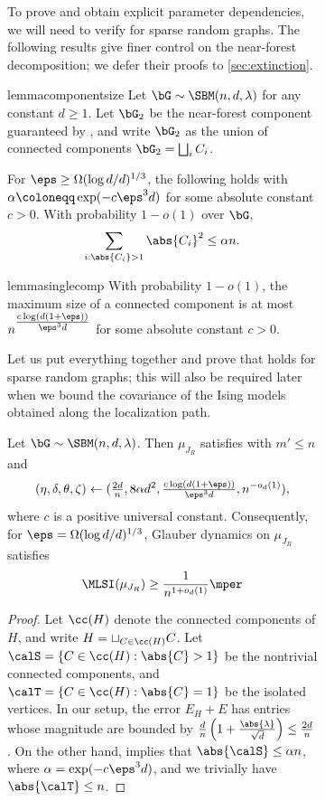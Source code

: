 \documentclass[11pt,letterpaper]{article}
\begin{document}
\begin{figure}
\begin{figure}
To prove  and obtain explicit parameter dependencies, we will need to verify  for sparse random graphs. 
The following results give finer control on the near-forest decomposition; we defer their proofs to \cref{sec:extinction}.
\begin{restatable}{lemma}{componentsize}\label{lem:component-size}
    Let $\bG\sim\SBM(n, d, \lambda)$ for any constant $d\ge 1$. Let $\bG_2$ be the near-forest component guaranteed by , and write $\bG_2$ as the union of connected components $\bG_2 = \bigsqcup_{i} C_i$.

    For $\eps \ge \Omega(\log d/d)^{1/3}$, the following holds with $\alpha \coloneqq \exp(-c\eps^3 d)$ for some absolute constant $c > 0$.
    With probability $1 - o(1)$ over $\bG$, 
    \[
        \sum_{i: \abs{C_i} > 1} \abs{C_i}^2 \le \alpha n.
    \]
\end{restatable}

\begin{restatable}{lemma}{singlecomp}\label{lem:single-component-bound}
    With probability $1-o(1)$, the maximum size of a connected component is at most $n^{\tfrac{c\log(d(1+\eps))}{\eps^3 d}}$ for some absolute constant $c > 0$.
\end{restatable}

Let us put everything together and prove that  holds for sparse random graphs; this will also be required later when we bound the covariance of the Ising models obtained along the localization path.

\begin{lemma}\label{lem:parameter-dep}
    Let $\bG \sim \SBM(n, d, \lambda)$. Then $\mu_{J_{R}}$ satisfies  with $m' \le n$ and
    \begin{align*}
        (\eta, \delta, \theta, \zeta) \leftarrow (\tfrac{2d}{n}, 8\alpha d^2, \tfrac{c\log(d(1+\eps))}{\eps^3 d}, n^{-o_d(1)}),
    \end{align*}
    where $c$ is a positive universal constant.
    Consequently, for $\eps = \Omega(\log d/d)^{1/3}$, Glauber dynamics on $\mu_{J_R}$ satisfies
    \[
        \MLSI(\mu_{J_R}) \ge \frac{1}{n^{1 + o_d(1)}}\mper
    \]
\end{lemma}
\begin{proof}
    Let $\cc(H)$ denote the connected components of $H$, and write $H = \sqcup_{C \in \cc(H)} C$. Let $\calS = \{C \in \cc(H): \abs{C} > 1\}$ be the nontrivial connected components, and $\calT = \{C \in \cc(H): \abs{C} = 1\}$ be the isolated vertices. 
    In our setup, the error $E_H + E$ has entries whose magnitude are bounded by $\frac{d}{n}\left(1 + \frac{\abs{\lambda}}{\sqrt{d}}\right) \le \frac{2d}{n}$. 
    On the other hand, 
     implies that $\abs{\calS} \le \alpha n$, where $\alpha = \exp(-c\eps^3 d)$, and we trivially have $\abs{\calT} \le n$.
    

\end{proof}
\end{figure}
\end{figure}
\end{document}
